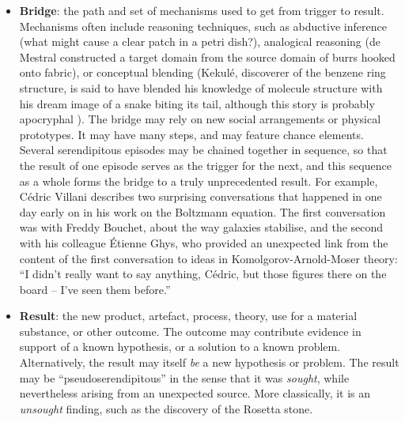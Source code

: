 \begin{itemize}
\item \textbf{Bridge}: the path and set of mechanisms used to get from
  trigger to result.  Mechanisms often include reasoning techniques,
  such as abductive inference (what might cause a clear patch in a
  petri dish?), analogical reasoning (de Mestral constructed a target
  domain from the source domain of burrs hooked onto fabric), or
  conceptual blending (Kekul\'e, discoverer of the benzene ring
  structure, is said to have blended his knowledge of molecule
  structure with his dream image of a snake biting its tail, although
  this story is probably apocryphal
  \cite[p.~xv]{kennedy2016inventology}).  The bridge may rely on new
  social arrangements or physical prototypes.  It may have many steps,
  and may feature chance elements.  Several serendipitous episodes may
  be chained together in sequence, so that the result of one episode
  serves as the trigger for the next, and this sequence as a whole
  forms the bridge to a truly unprecedented result.  For example,
  C\'edric Villani \cite[pp.~15--16]{birth-of-a-theorem} describes
  two surprising conversations that happened in one day early on in
  his work on the Boltzmann equation.  The first conversation was with
  Freddy Bouchet, about the way galaxies stabilise,
   and the second with his colleague \'Etienne Ghys, who provided an
   unexpected link from the content of the first conversation to ideas
   in Komolgorov-Arnold-Moser theory: ``I didn't really want to say
   anything, C\'edric, but those figures there on the board -- I've
   seen them before.''
\end{itemize}


\begin{itemize}
\item \textbf{Result}: the new product, artefact, process, theory, use
  for a material substance, or other outcome.  The outcome may
  contribute evidence in support of a known hypothesis, or a solution
  to a known problem.  Alternatively, the result may itself {\em be} a
  new hypothesis or problem.  The result may be
  ``pseudoserendipitous'' in the sense that it was {\em sought}, while
  nevertheless arising from an unexpected source.  More classically,
  it is an \emph{unsought} finding, such as the discovery of the
  Rosetta stone.
\end{itemize}

